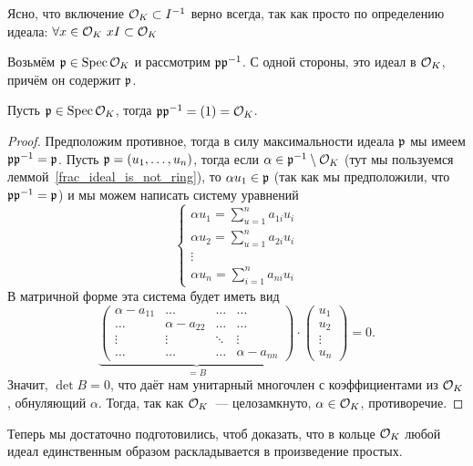 	\begin{remark}
		Ясно, что включение $\mathcal{O}_{K} \subset I^{-1}$ верно всегда, так как просто по определению идеала: $\forall x \in \mathcal{O}_{K} \ xI \subset \mathcal{O}_{K}$
	\end{remark}

	Возьмём $\mathfrak{p} \in \operatorname{Spec}{\mathcal{O}_{K}}$ и рассмотрим $\mathfrak{p} \mathfrak{p}^{-1}$. С одной стороны, это идеал в $\mathcal{O}_{K}$, причём он содержит $\mathfrak{p}$.

	\begin{lemma}\label{p p^{-1} = (1)} 
		Пусть $\mathfrak{p} \in \operatorname{Spec}{\mathcal{O}_{K}}$, тогда $\mathfrak{p} \mathfrak{p}^{-1} = (1) = \mathcal{O}_{K}$.
	\end{lemma}
	\begin{proof}
		Предположим противное, тогда в силу максимальности идеала $\mathfrak{p}$ мы имеем $\mathfrak{p} \mathfrak{p}^{-1} = \mathfrak{p}$. 
		Пусть $\mathfrak{p} = (u_{1}, \ldots, u_{n})$, тогда если $\alpha \in \mathfrak{p}^{-1} \setminus \mathcal{O}_{K}$ (тут мы пользуемся леммой~\ref{frac_ideal_is_not_ring}), то $\alpha u_{1} \in \mathfrak{p}$ (так как мы предположили, что $\mathfrak{p} \mathfrak{p}^{-1} = \mathfrak{p}$) и мы можем написать систему уравнений 
		\[
			\begin{cases} \alpha u_{1} = \sum\limits_{u = 1}^{n} a_{1 i} u_{i}   \\
			\alpha u_{2} = \sum\limits_{u = 1}^{n} a_{2 i} u_{i} \\ 
			\vdots \\ 
			\alpha u_{n} = \sum\limits_{i = 1}^{n} a_{n i} u_{i} \end{cases}
		\]
		В матричной форме эта система будет иметь вид 
		\[
			\underbrace{\begin{pmatrix} \alpha - a_{11} & \ldots & \ldots & \ldots \\ \ldots & \alpha - a_{22} & \ldots & \ldots \\ \vdots & \vdots & \ddots & \vdots \\ \ldots & \ldots & \ldots & \alpha - a_{nn} \end{pmatrix}}_{= B} \cdot \begin{pmatrix} u_{1} \\ u_{2} \\ \vdots \\ u_{n} \end{pmatrix} = 0.
		\]
		Значит, $\det{B} = 0$, что даёт нам унитарный многочлен с коэффициентами из $\mathcal{O}_{K}$, обнуляющий $\alpha$. Тогда, так как $\mathcal{O}_{K}$~--- целозамкнуто, $\alpha \in \mathcal{O}_{K}$, противоречие. 
	\end{proof}

	Теперь мы достаточно подготовились, чтоб доказать, что в кольце $\mathcal{O}_{K}$ любой идеал единственным образом раскладывается в произведение простых. 

